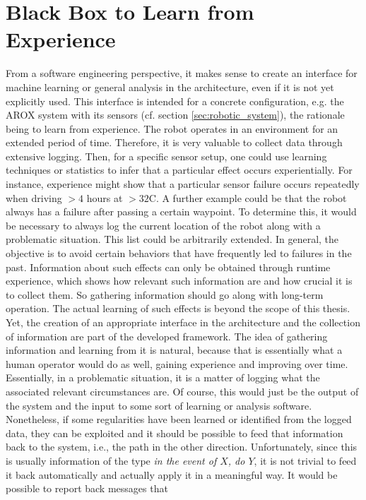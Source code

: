 \documentclass[english, master, utf8]{base/thesis_KBS}
\begin{document}
\section{Black Box to Learn from Experience}

From a software engineering perspective, it makes sense to create an interface for machine learning or general analysis in the architecture, even if it is not yet explicitly used.
This interface is intended for a concrete configuration, e.g. the AROX system with its sensors (cf. section \ref{sec:robotic_system}), the rationale being to learn from experience. The robot operates in an environment for an
extended period of time. Therefore, it is very valuable to collect data through extensive logging. Then, for a specific sensor setup, one could use learning techniques or statistics
to infer that a particular effect occurs experientially. For instance, experience might show that a particular sensor failure occurs repeatedly when driving $> 4$ hours at
$> 32$\textdegree{}C. A further example could be that the robot always has a failure after passing a certain waypoint. To determine this, it would be necessary to always
log the current location of the robot along with a problematic situation. This list could be arbitrarily extended.
In general, the objective is to avoid certain behaviors that have frequently led to failures in the past. Information about such effects can only be
obtained through runtime experience, which shows how relevant such information are and how crucial it is to collect them. So gathering information should go along with long-term
operation. The actual learning of such effects is beyond the scope of this thesis. Yet, the creation of an appropriate interface in the architecture and the collection of information
are part of the developed framework. The idea of gathering information and learning from it is natural, because that is essentially what a human operator would do as well, gaining
experience and improving over time. Essentially, in a problematic situation, it is a matter of logging what the associated relevant circumstances are. Of course, this would just be
the output of the system and the input to some sort of learning or analysis software. Nonetheless, if some regularities have been learned or identified from the logged data, they can
be exploited and it should be possible to feed that information back to the system, i.e., the path in the other direction. Unfortunately, since this is usually information of the type
\textit{in the event of $X$, do $Y$}, it is not trivial to feed it back automatically and actually apply it in a meaningful way. It would be possible to report back messages that
\end{document}
